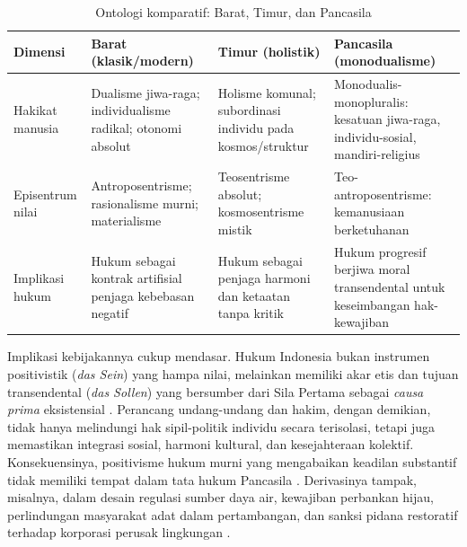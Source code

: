 \documentclass[journal]{IEEEtran}
\begin{document}
\begin{table}[!htbp]
\centering
\footnotesize
\renewcommand{\arraystretch}{1.25}
\caption{Ontologi komparatif: Barat, Timur, dan Pancasila}
\label{tab:ontologi}
\begin{tabular}{@{}p{2.0cm}p{3.0cm}p{3.0cm}p{5.5cm}@{}}
\toprule
\textbf{Dimensi} & \textbf{Barat (klasik/modern)} & \textbf{Timur (holistik)} & \textbf{Pancasila (monodualisme)} \\
\midrule
Hakikat manusia & Dualisme jiwa-raga; individualisme radikal; otonomi absolut & Holisme komunal; subordinasi individu pada kosmos/struktur & Monodualis-monopluralis: kesatuan jiwa-raga, individu-sosial, mandiri-religius \cite{notonagoro1975,pristiwiyanto2021} \\
\addlinespace
Episentrum nilai & Antroposentrisme; rasionalisme murni; materialisme & Teosentrisme absolut; kosmosentrisme mistik & Teo-antroposentrisme: kemanusiaan berketuhanan \cite{latif2018} \\
\addlinespace
Implikasi hukum & Hukum sebagai kontrak artifisial penjaga kebebasan negatif & Hukum sebagai penjaga harmoni dan ketaatan tanpa kritik & Hukum progresif berjiwa moral transendental untuk keseimbangan hak-kewajiban \cite{syamsudin2022,aswandi2019} \\
\bottomrule
\end{tabular}
\end{table}

Implikasi kebijakannya cukup mendasar. Hukum Indonesia bukan instrumen positivistik (\textit{das Sein}) yang hampa nilai, melainkan memiliki akar etis dan tujuan transendental (\textit{das Sollen}) yang bersumber dari Sila Pertama sebagai \textit{causa prima} eksistensial \cite{syamsudin2022,rahmatullah2022}. Perancang undang-undang dan hakim, dengan demikian, tidak hanya melindungi hak sipil-politik individu secara terisolasi, tetapi juga memastikan integrasi sosial, harmoni kultural, dan kesejahteraan kolektif. Konsekuensinya, positivisme hukum murni yang mengabaikan keadilan substantif tidak memiliki tempat dalam tata hukum Pancasila \cite{assiddiqie2006,mahfud2009}. Derivasinya tampak, misalnya, dalam desain regulasi sumber daya air, kewajiban perbankan hijau, perlindungan masyarakat adat dalam pertambangan, dan sanksi pidana restoratif terhadap korporasi perusak lingkungan \cite{yusa2022}.
\end{document}
